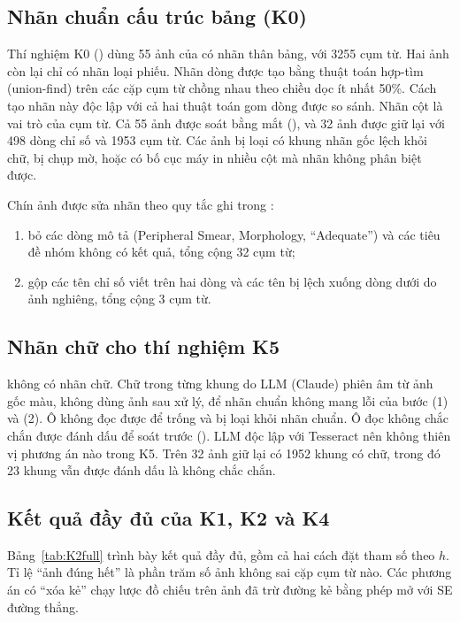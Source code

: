 \subsection{Nhãn chuẩn cấu trúc bảng (K0)}
Thí nghiệm K0 () dùng 55 ảnh của  có nhãn thân bảng, với \num{3255} cụm từ.
Hai ảnh còn lại chỉ có nhãn loại phiếu.
Nhãn dòng được tạo bằng thuật toán hợp-tìm (union-find) trên các cặp cụm từ chồng nhau theo chiều dọc ít nhất 50\%.
Cách tạo nhãn này độc lập với cả hai thuật toán gom dòng được so sánh.
Nhãn cột là vai trò của cụm từ.
Cả 55 ảnh được soát bằng mắt (), và 32 ảnh được giữ lại với 498 dòng chỉ số và \num{1953} cụm từ.
Các ảnh bị loại có khung nhãn gốc lệch khỏi chữ, bị chụp mờ, hoặc có bố cục máy in nhiều cột mà nhãn không phân biệt được.

Chín ảnh được sửa nhãn theo quy tắc ghi trong :
\begin{enumerate}[label=(\roman*)]
  \item bỏ các dòng mô tả (Peripheral Smear, Morphology, ``Adequate'') và các tiêu đề nhóm không có kết quả, tổng cộng 32 cụm từ;
  \item gộp các tên chỉ số viết trên hai dòng và các tên bị lệch xuống dòng dưới do ảnh nghiêng, tổng cộng 3 cụm từ.
\end{enumerate}

\subsection{Nhãn chữ cho thí nghiệm K5}
 không có nhãn chữ.
Chữ trong từng khung do LLM (Claude) phiên âm từ ảnh gốc màu, không dùng ảnh sau xử lý, để nhãn chuẩn không mang lỗi của bước (1) và (2).
Ô không đọc được để trống và bị loại khỏi nhãn chuẩn.
Ô đọc không chắc chắn được đánh dấu để soát trước ().
LLM độc lập với Tesseract nên không thiên vị phương án nào trong K5.
Trên 32 ảnh giữ lại có \num{1952} khung có chữ, trong đó 23 khung vẫn được đánh dấu là không chắc chắn.

\subsection{Kết quả đầy đủ của K1, K2 và K4}
Bảng~\ref{tab:K2full} trình bày kết quả đầy đủ, gồm cả hai cách đặt tham số theo $h$.
Tỉ lệ ``ảnh đúng hết'' là phần trăm số ảnh không sai cặp cụm từ nào.
Các phương án có ``xóa kẻ'' chạy lược đồ chiếu trên ảnh đã trừ đường kẻ bằng phép mở với SE đường thẳng.

